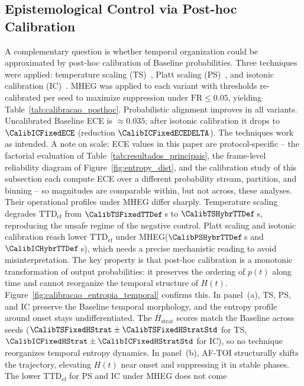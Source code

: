 \documentclass[a4paper,fleqn]{cas-dc}
\newcommand{\AFTOI}{\mbox{AF-TOI}\xspace}
\newcommand{\MHEG}{\mbox{MHEG}\xspace}
\begin{document}
\subsection{Epistemological Control via Post-hoc Calibration}
\label{sec:controle_calibracao}
A complementary question is whether temporal organization could be approximated
by post-hoc calibration of Baseline probabilities. Three techniques were
applied: temperature scaling (TS)~\cite{guo2017calibration}, Platt scaling (PS)~\cite{platt1999probabilistic},
and isotonic calibration (IC)~\cite{zadrozny2002isotonic}. \MHEG was applied to each variant with thresholds
re-calibrated per seed to maximize suppression under $\mathrm{FR} \le 0.05$,
yielding Table~\ref{tab:calibracao_posthoc}.
Probabilistic alignment improves in all variants. Uncalibrated Baseline ECE is
$\approx 0.035$; after isotonic calibration it drops to $\CalibICFixedECE$
(reduction $\CalibICFixedECEDELTA$). The techniques work as intended.
{\color{\revcolor}A note on scale: ECE values in this paper are
protocol-specific -- the factorial evaluation of
Table~\ref{tab:resultados_principais}, the frame-level reliability diagram of
Figure~\ref{fig:entropy_dist}, and the calibration study of this subsection
each compute ECE over a different probability stream, partition, and binning
-- so magnitudes are comparable within, but not across, these analyses.}
Their operational profiles under \MHEG differ sharply. Temperature scaling
degrades $\mathrm{TTD}_{\mathrm{ef}}$ from $\CalibTSFixedTTDef$\,s to
$\CalibTSHybrTTDef$\,s, reproducing the unsafe regime of the negative control.
Platt scaling and isotonic calibration reach lower $\mathrm{TTD}_{\mathrm{ef}}$
under \MHEG ($\CalibPSHybrTTDef$\,s and $\CalibICHybrTTDef$\,s), which needs a
precise mechanistic reading to avoid misinterpretation.
The key property is that post-hoc calibration is a monotonic transformation of
output probabilities: it preserves the ordering of $p(t)$ along time and cannot
reorganize the temporal structure of $H(t)$.
Figure~\ref{fig:calibracao_entropia_temporal} confirms this. In panel~(a), TS,
PS, and IC preserve the Baseline temporal morphology, and the entropy profile
around onset stays undifferentiated. The $H_{\mathrm{strat}}$ scores match the
Baseline across seeds ($\CalibTSFixedHStrat \pm \CalibTSFixedHStratStd$ for TS,
$\CalibICFixedHStrat \pm \CalibICFixedHStratStd$ for IC), so no technique
reorganizes temporal entropy dynamics. In panel~(b), \AFTOI structurally shifts
the trajectory, elevating $H(t)$ near onset and suppressing it in stable phases.
The lower $\mathrm{TTD}_{\mathrm{ef}}$ for PS and IC under \MHEG does not come
\end{document}
